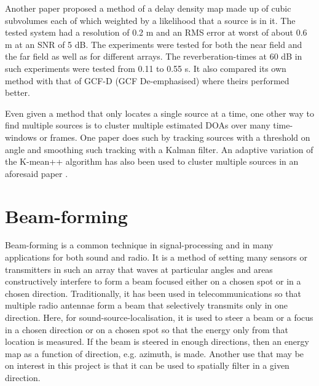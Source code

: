 \documentclass[notitlepage]{report}
\begin{document}
Another paper \cite{boora_tdoa-based_2020} proposed a method of a delay density map made up of cubic subvolumes each of which weighted by a likelihood that a source is in it. The tested system had a resolution of 0.2 \si{m} and an RMS error at worst of about 0.6 \si{m} at an SNR of 5 \si{dB}. The experiments were tested for both the near field and the far field as well as for different arrays. The reverberation-times at 60 \si{dB} in such experiments were tested from 0.11 to 0.55 \si{s}. It also compared its own method with that of GCF-D (GCF De-emphasised) where theirs performed better.

Even given a method that only locates a single source at a time, one other way to find multiple sources is to cluster multiple estimated DOAs over many time-windows or frames. One paper \cite{rascon_lightweight_2015} does such by tracking sources with a threshold on angle and smoothing such tracking with a Kalman filter. An adaptive variation of the K-mean++ algorithm has also been used to cluster multiple sources in an aforesaid paper \cite{hu_estimation_2009}.

\section{Beam-forming}

Beam-forming is a common technique in signal-processing and in many applications for both sound and radio. It is a method of setting many sensors or transmitters in such an array that waves at particular angles and areas constructively interfere to form a beam focused either on a chosen spot or in a chosen direction. Traditionally, it has been used in telecommunications so that multiple radio antennae form a beam that selectively transmits only in one direction. Here, for sound-source-localisation, it is used to steer a beam or a focus in a chosen direction or on a chosen spot so that the energy only from that location is measured. If the beam is steered in enough directions, then an energy map as a function of direction, e.g. azimuth, is made. Another use that may be on interest in this project is that it can be used to spatially filter in a given direction.
\end{document}
